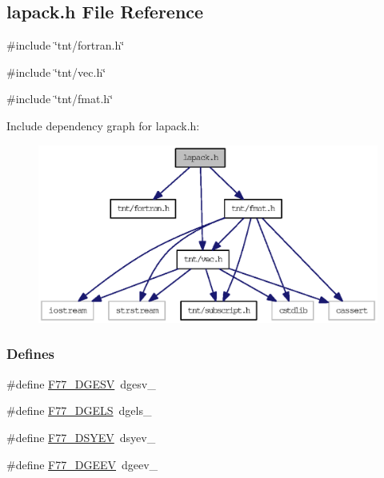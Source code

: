 \subsection{lapack.h File Reference}
\label{lapack_8h}
{\ttfamily \#include \char`\"{}tnt/fortran.h\char`\"{}}\par
{\ttfamily \#include \char`\"{}tnt/vec.h\char`\"{}}\par
{\ttfamily \#include \char`\"{}tnt/fmat.h\char`\"{}}\par
Include dependency graph for lapack.h:
\nopagebreak
\begin{figure}[H]
\begin{center}
\leavevmode
\includegraphics[width=400pt]{lapack_8h__incl}
\end{center}
\end{figure}
\subsubsection*{Defines}
\begin{DoxyCompactItemize}
\item 
\#define \hyperlink{lapack_8h_a78b0396f6cb0dc34b89486a9fa8af01c}{F77\_\-DGESV}~dgesv\_\-
\item 
\#define \hyperlink{lapack_8h_a1a979a68c68c7188390d19b8e3a71e1f}{F77\_\-DGELS}~dgels\_\-
\item 
\#define \hyperlink{lapack_8h_afd28630502925316bb87b8e3edae87cd}{F77\_\-DSYEV}~dsyev\_\-
\item 
\#define \hyperlink{lapack_8h_a03c36d7eed550c5c3f0474561ec6ba0a}{F77\_\-DGEEV}~dgeev\_\-
\end{DoxyCompactItemize}
